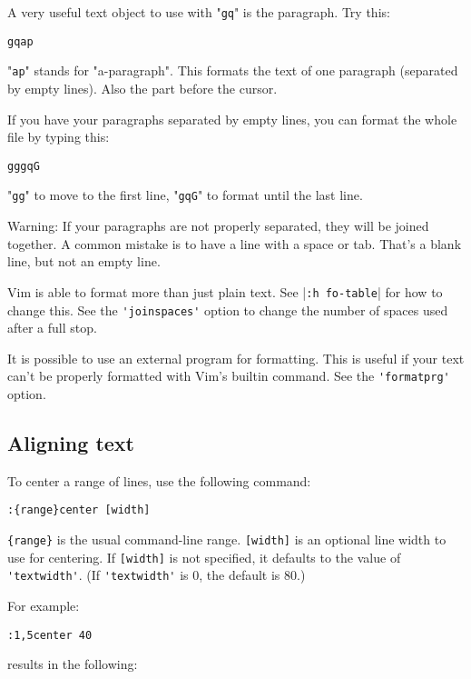A very useful text object to use with "\verb!gq!" is the paragraph.
Try this:

\begin{Verbatim}[samepage=true]
 gqap
\end{Verbatim}

"\verb!ap!" stands for "a-paragraph".
This formats the text of one paragraph (separated by empty lines).
Also the part before the cursor.

If you have your paragraphs separated by empty lines, you can format the whole file by typing this:

\begin{Verbatim}[samepage=true]
 gggqG
\end{Verbatim}

"\verb!gg!" to move to the first line, "\verb!gqG!" to format until the last line.

Warning: If your paragraphs are not properly separated, they will be joined together.
A common mistake is to have a line with a space or tab.
That's a blank line, but not an empty line.

Vim is able to format more than just plain text.
See |\verb!:h fo-table!| for how to change this.
See the \verb!'joinspaces'! option to change the number of spaces used after a full stop.

It is possible to use an external program for formatting.
This is useful if your text can't be properly formatted with Vim's builtin command.
See the \verb!'formatprg'! option.
\subsection{Aligning text}
To center a range of lines, use the following command:

\begin{Verbatim}[samepage=true]
 :{range}center [width]
\end{Verbatim}

\verb!{range}! is the usual command-line range.
\verb![width]! is an optional line width to use for centering.
If \verb![width]! is not specified, it defaults to the value of \verb!'textwidth'!.
(If \verb!'textwidth'! is 0, the default is 80.)

For example:

\begin{Verbatim}[samepage=true]
 :1,5center 40
\end{Verbatim}

results in the following:

